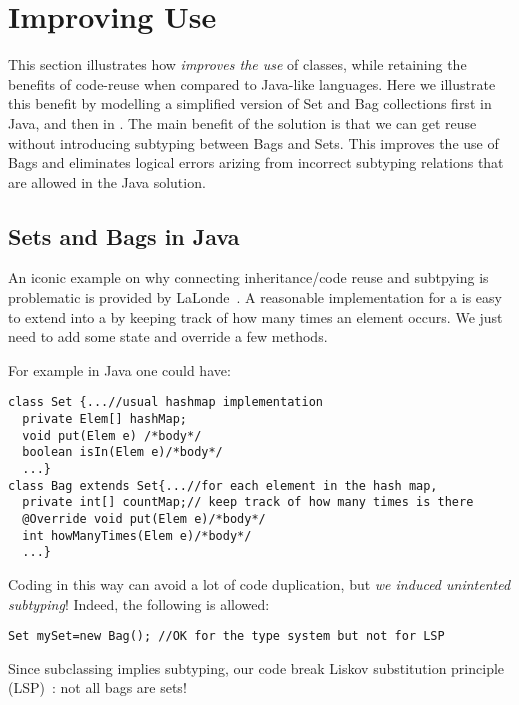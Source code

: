 \section{Improving Use}

This section illustrates how 
\name \emph{improves the use} of classes, while
retaining the benefits of code-reuse when compared to Java-like languages. 
Here we illustrate this benefit by modelling a simplified version of
Set and Bag collections first in Java, and then in \name.
The main benefit of the \name solution is that we can get reuse 
without introducing subtyping between Bags and Sets. This improves the 
use of Bags and eliminates logical errors arizing from incorrect
subtyping relations that are allowed in the Java solution. 

\subsection{Sets and Bags in Java}
An iconic example on why connecting inheritance/code reuse and
subtpying is problematic is provided by
LaLonde~\cite{LaLonde:1991:SSS:110673.110679}.  A reasonable
implementation for a \Q@Set@ is easy to extend into a \Q@Bag@ by
keeping track of how many times an element occurs.  We just need to
add some state and override a few methods.

For example in Java one could have:

\begin{lstlisting}
class Set {...//usual hashmap implementation
  private Elem[] hashMap;
  void put(Elem e) /*body*/
  boolean isIn(Elem e)/*body*/
  ...}
class Bag extends Set{...//for each element in the hash map,
  private int[] countMap;// keep track of how many times is there
  @Override void put(Elem e)/*body*/
  int howManyTimes(Elem e)/*body*/
  ...}\end{lstlisting}

\noindent Coding \Q@Bag@ in this way can avoid a lot of code
duplication, but \emph{we induced unintented subtyping}! 
Indeed, the following is allowed:

\begin{lstlisting}
Set mySet=new Bag(); //OK for the type system but not for LSP
\end{lstlisting}
Since subclassing implies subtyping, our code break Liskov substitution principle (LSP)~\cite{martin2000design}: not all bags are sets!

